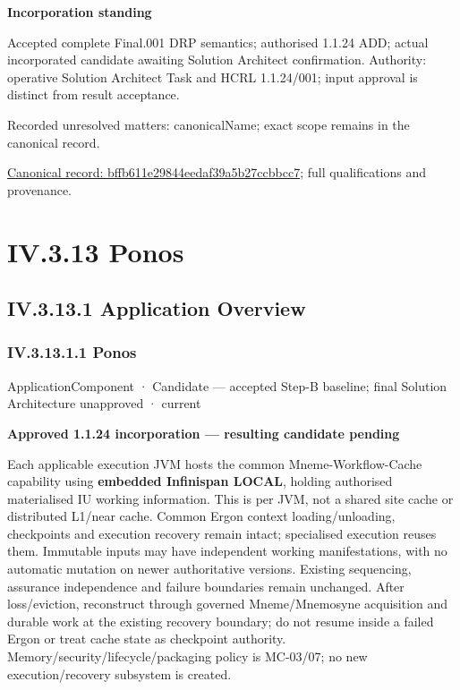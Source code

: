 \par\medskip\textbf{Incorporation standing}\par


Accepted complete Final.001 DRP semantics; authorised 1.1.24 ADD; actual incorporated candidate awaiting Solution Architect confirmation. Authority: operative Solution Architect Task and HCRL 1.1.24/001; input approval is distinct from result acceptance.


{\small Recorded unresolved matters: canonicalName; exact scope remains in the canonical record.}\par
{\footnotesize \href{../../../../continuum/application/application-service/bffb611e29844eedaf39a5b27ccbbcc7.md}{Canonical record: bffb611e29844eedaf39a5b27ccbbcc7}; full qualifications and provenance.}\par
\section*{IV.3.13 Ponos}
\label{navigation:IV.3.13}

\subsection*{IV.3.13.1 Application Overview}
\label{navigation:IV.3.13.1}

\subsubsection*{IV.3.13.1.1 Ponos}
\label{navigation:IV.3.13.1.1}

\label{element:b521762c1ea444b48cd5f66be3752d30}
{\small ApplicationComponent · Candidate — accepted Step-B baseline; final Solution Architecture unapproved · current}\par

\par\medskip\textbf{Approved 1.1.24 incorporation — resulting candidate pending}\par


Each applicable execution JVM hosts the common Mneme-Workflow-Cache capability using \textbf{embedded Infinispan LOCAL}, holding authorised materialised IU working information. This is per JVM, not a shared site cache or distributed L1/near cache. Common Ergon context loading/unloading, checkpoints and execution recovery remain intact; specialised execution reuses them. Immutable inputs may have independent working manifestations, with no automatic mutation on newer authoritative versions. Existing sequencing, assurance independence and failure boundaries remain unchanged. After loss/eviction, reconstruct through governed Mneme/Mnemosyne acquisition and durable work at the existing recovery boundary; do not resume inside a failed Ergon or treat cache state as checkpoint authority. Memory/security/lifecycle/packaging policy is MC-03/07; no new execution/recovery subsystem is created.




